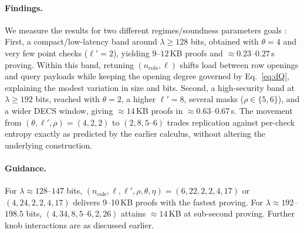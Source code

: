\paragraph{Findings.}
We measure the results for two different regimes/soundness parameters goals :
First, a compact/low-latency band around $\lambda\!\geq\!128$ bits, obtained with $\theta=4$ and very few point checks ($\ell'=2$), yielding $9$–$12$\,KB proofs and $\approx 0.23$–$0.27$\,s proving.
Within this band, retuning $(n_{\text{cols}},\ell)$ shifts load between row openings and query payloads while keeping the opening degree governed by Eq.~\eqref{eq:dQ}, explaining the modest variation in size and bits.
Second, a high-security band at $\lambda\!\geq 192$ bits, reached with $\theta=2$, a higher $\ell'=8$, several masks ($\rho\in\{5,6\}$), and a wider DECS window, giving $\approx 14$\,KB proofs in $\approx 0.63$–$0.67$\,s.
The movement from $(\theta,\ell',\rho)=(4,2,2)$ to $(2,8,5\text{–}6)$ trades replication against per-check entropy exactly as predicted by the earlier calculus, without altering the underlying construction.

\paragraph{Guidance.}
For $\lambda\!\approx\!128$–$147$ bits, $(n_{\text{cols}},\ell,\ell',\rho,\theta,\eta)=(6,22,2,2,4,17)$ or $(4,24,2,2,4,17)$ delivers 9–10\,KB proofs with the fastest proving.
For $\lambda\!\approx\!192$–$198.5$ bits, $(4,34,8,5\text{–}6,2,26)$ attains $\approx 14$\,KB at sub-second proving.
Further knob interactions are as discussed earlier.

